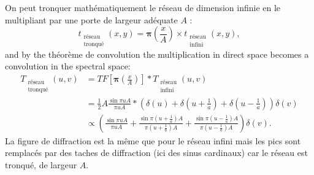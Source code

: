 On peut tronquer mathématiquement le réseau de dimension infinie en le
multipliant par une porte de largeur adéquate $A$ :
\begin{equation*}
  t_{\substack{\text{réseau}\\ \text{tronqué}}}(x,y)
    = \bm{\pi}\!\left(\frac{x}{A}\right) \times
      t_{\substack{\text{réseau}\\ \text{infini}}}(x,y),
\end{equation*}
and by the théorème de convolution the multiplication in direct space becomes a
convolution in the spectral space:
\begin{align*}
  T_{\substack{\text{réseau}\\ \text{tronqué}}}(u,v)
  &= TF\!\left[\bm{\pi}\!\left(\frac{x}{A}\right)\right] *
     T_{\substack{\text{réseau}\\ \text{infini}}}(u,v) \\
  &= \frac{1}{2} A \frac{\sin \pi u A}{\pi u A} *
     \left(\delta(u) + \delta\!\left(u+\frac{1}{a}\right)
     + \delta\!\left(u-\frac{1}{a}\right)\right)\delta(v) \\
  &\propto \left(\frac{\sin \pi u A}{\pi u A}
     + \frac{\sin \pi \left(u+\frac{1}{a}\right)A}{\pi\left(u+\frac{1}{a}\right)A}
     + \frac{\sin \pi \left(u-\frac{1}{a}\right)A}{\pi\left(u-\frac{1}{a}\right)A}
     \right)\delta(v).
\end{align*}
La figure de diffraction est la même que pour le réseau infini mais les pics sont
remplacés par des taches de diffraction (ici des sinus cardinaux) car le réseau
est tronqué, de largeur $A$.

\begin{figure}[h!]
  \centering
\end{figure}

